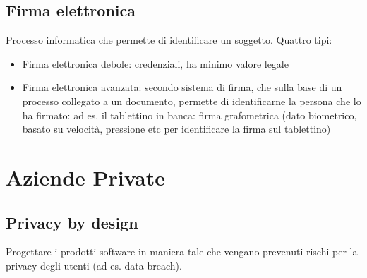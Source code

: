 \subsection{Firma elettronica}

Processo informatica che permette di identificare un soggetto. Quattro
tipi:

\begin{itemize}
\item
  Firma elettronica debole: credenziali, ha minimo valore legale
\item
  Firma elettronica avanzata: secondo sistema di firma, che sulla base
  di un processo collegato a un documento, permette di identificarne la
  persona che lo ha firmato: ad es. il tablettino in banca: firma
  grafometrica (dato biometrico, basato su velocità, pressione etc per
  identificare la firma sul tablettino)
\end{itemize}

\section{Aziende Private}

\subsection{Privacy by design}

Progettare i prodotti software in maniera tale che vengano prevenuti
rischi per la privacy degli utenti (ad es. data breach).
